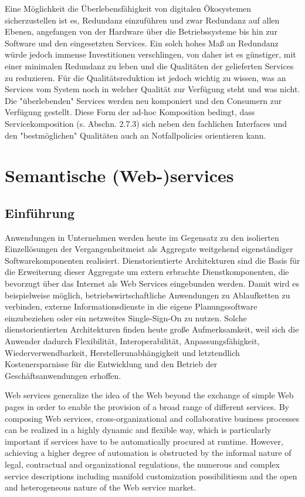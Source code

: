 \documentclass[10pt,a4paper]{article}
\begin{document}

Eine Möglichkeit die Überlebensfähigkeit von digitalen Ökosystemen sicherzustellen
ist es, Redundanz einzuführen und zwar Redundanz auf allen Ebenen, angefangen
von der Hardware über die Betriebssysteme bis hin zur Software und den
eingesetzten Services. Ein solch hohes Maß an Redundanz würde jedoch immense
Investitionen verschlingen, von daher ist es günstiger, mit einer minimalen Redundanz
zu leben und die Qualitäten der gelieferten Services zu reduzieren. Für die
Qualitätsreduktion ist jedoch wichtig zu wissen, was an Services vom System noch
in welcher Qualität zur Verfügung steht und was nicht. Die "überlebenden" Services
werden neu komponiert und den Consumern zur Verfügung gestellt. Diese Form der
ad-hoc Komposition bedingt, dass Servicekomposition (s. Abschn. 2.7.3) sich neben
den fachlichen Interfaces und den "bestmöglichen" Qualitäten auch an Notfallpolicies
orientieren kann. \cite{mkulss}

\section{Semantische (Web-)services}
\label{l:sem-web-ser}
\subsection{Einführung}

Anwendungen in Unternehmen werden heute im Gegensatz zu den isolierten Einzellösungen
der Vergangenheitmeist als Aggregate weitgehend eigenständiger Softwarekomponenten realisiert.
Dienstorientierte Architekturen sind die Basis für die Erweiterung dieser Aggregate um
extern erbrachte Dienstkomponenten, die bevorzugt über das Internet als Web Services eingebunden
werden. Damit wird es beispielweise möglich, betriebswirtschaftliche Anwendungen zu
Ablaufketten zu verbinden, externe Informationsdienste in die eigene Planungssoftware einzubeziehen
oder ein netzweites Single-Sign-On zu nutzen. Solche dienstorientierten Architekturen
finden heute große Aufmerksamkeit, weil sich die Anwender dadurch Flexibilität, Interoperabilität,
Anpassungsfähigkeit, Wiederverwendbarkeit, Herstellerunabhängigkeit und letztendlich
Kostenersparnisse für die Entwicklung und den Betrieb der Geschäftsanwendungen erhoffen. \cite{addo}

Web services generalize the idea of the Web beyond the exchange of simple Web pages in order to enable the provision of a broad range of different services. By composing Web services, cross-organizational and collaborative business processes can be realized in a highly dynamic and flexible way, which is particularly important if services have to be automatically procured at runtime. However, achieving a higher degree of automation is obstructed by the informal nature of legal, contractual and organizational regulations, the numerous and complex service descriptions including manifold customization possibilitiesm and the open and heterogeneous nature of the Web service market.
\end{document}
